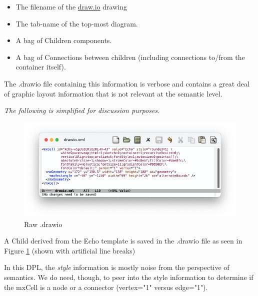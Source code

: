 \documentclass[10pt,anonymous,review]{acmart}
\begin{document}
\begin{itemize}
\setlength\itemsep{-0.3em}
\item The filename of the \href{http://draw.io}{draw.io} drawing

\item The tab-name of the top-most diagram.

\item A bag of Children components.

\item A bag of Connections between children (including connections to/from the container itself).

\end{itemize}

\newpage

The .drawio file containing this information is verbose and contains a great deal of graphic layout information that is not relevant at the semantic level.

\emph{The following is simplified for discussion purposes.}
\vspace{1\baselineskip}

  \begin{figure}[h]
    \centering
    \includegraphics[trim=1cm 1.9cm 1.5cm 1cm, clip, scale=0.4]{./media/drawio1.png}
    \caption{Raw .drawio}
    \label{drawio1}
\end{figure}

A Child derived from the Echo template is saved in the .drawio file as seen in Figure \ref{drawio1} (shown with artificial line breaks)

In this DPL, the \emph{style} information is mostly noise from the perspective of semantics. We do need, though, to peer into the style information to determine if the mxCell is a node or a connector (vertex="1" versus edge="1").
\end{document}
